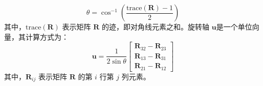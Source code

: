 \begin{equation}
\theta = \cos^{-1} \left( \frac{\text{trace}(\symbf{R}) - 1}{2} \right)
\end{equation}
其中，\( \text{trace}(\symbf{R}) \) 表示矩阵 \( \symbf{R} \) 的迹，即对角线元素之和。旋转轴 \( \symbf{u} \)是一个单位向量，其计算方式为：
\begin{equation}
\symbf{u} = \frac{1}{2 \sin \theta} \begin{bmatrix}
\symbf{R}_{32} - \symbf{R}_{23} \\
\symbf{R}_{13} - \symbf{R}_{31} \\
\symbf{R}_{21} - \symbf{R}_{12}
\end{bmatrix}
\end{equation}
其中，\( \symbf{R}_{ij} \) 表示矩阵 \( \symbf{R} \) 的第 \( i \) 行第 \( j \) 列元素。
